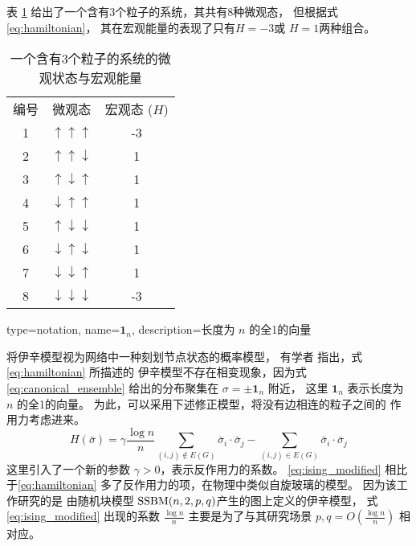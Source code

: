\begin{example}
  表 \ref{tab:particles_3} 给出了一个含有3个粒子的系统，其共有8种微观态，
  但根据式\eqref{eq:hamiltonian}， 其在宏观能量的表现了只有$H=-3$或 $H=1$两种组合。
\begin{table}
  \centering
\begin{tabular}{ccc}
		编号 & 微观态 & 宏观态 ($H$) \\
		1 & $\uparrow\uparrow\uparrow$ & -3 \\
		2 & $\uparrow\uparrow\downarrow$ & 1 \\
		3 & $\uparrow\downarrow\uparrow$ & 1 \\
		4 & $\downarrow\uparrow\uparrow$ & 1 \\
		5 & $\uparrow\downarrow\downarrow$ & 1    \\
6 & $\downarrow\uparrow\downarrow$ & 1 \\
7 & $\downarrow\downarrow\uparrow$ & 1 \\
8 & $\downarrow\downarrow\downarrow$ & -3 \\
\end{tabular}
\caption{一个含有3个粒子的系统的微观状态与宏观能量}
\label{tab:particles_3}
\end{table}
\end{example}

{
  type=notation,
  name={\ensuremath{\mathbf{1}_n}},
  description={长度为 $n$ 的全1的向量}
}

将伊辛模型视为网络中一种刻划节点状态的概率模型，
有学者\cite{ye2020exact}
指出，式\eqref{eq:hamiltonian} 所描述的
伊辛模型不存在相变现象，因为式\eqref{eq:canonical_ensemble}
给出的分布聚集在 $\sigma=\pm \mathbf{1}_n$ 附近，
这里 $\mathbf{1}_n$ 表示长度为 $n$ 的全1的向量。
为此，可以采用下述修正模型，将没有边相连的粒子之间的
作用力考虑进来。
\begin{equation}\label{eq:ising_modified}
  H(\bar{\sigma}) = \gamma \frac{\log n}{n} \sum_{(i,j)\not\in E(G)}
  \bar{\sigma}_i \cdot \bar{\sigma}_j
	- \sum_{(i,j)\in E(G)}
  \bar{\sigma}_i  \cdot \bar{\sigma}_j
\end{equation}
这里引入了一个新的参数 $\gamma > 0$，表示反作用力的系数。
\eqref{eq:ising_modified}
相比于\eqref{eq:hamiltonian}
多了反作用力的项，在物理中类似自旋玻璃的模型\cite{lenka2016physics}。
因为该工作研究的是
由随机块模型 $\operatorname{SSBM}(n,2,p,q)$产生的图上定义的伊辛模型，
式\eqref{eq:ising_modified} 出现的系数
$\frac{\log n}{n}$
主要是为了与其研究场景 $p,q=O\left(\frac{\log n}{n} \right)$
相对应。

